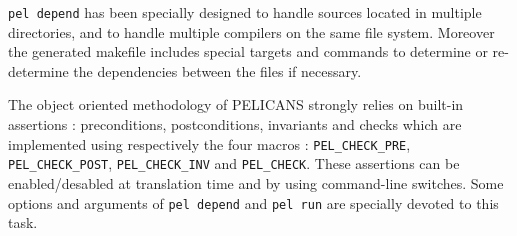 \documentclass{article}
\begin{document}
\texttt{pel depend} has been specially designed to handle
sources located in multiple directories, and to handle
multiple compilers on the same file system. Moreover
the generated makefile includes special targets and commands
to determine or re-determine the dependencies between the files if necessary.



The object oriented methodology of PELICANS strongly relies on
built-in assertions : preconditions, postconditions, invariants and
checks which are implemented using respectively the four
macros : \texttt{PEL\_CHECK\_PRE}, \texttt{PEL\_CHECK\_POST}, \texttt{PEL\_CHECK\_INV}
and \texttt{PEL\_CHECK}.
These assertions can be enabled/desabled at translation time and by
using command-line switches. Some options and
arguments of \texttt{pel depend} and \texttt{pel run} are specially devoted to
this task.
\end{document}
